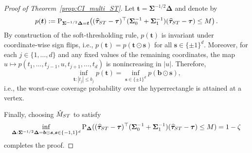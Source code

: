 \documentclass[10pt,a4paper]{amsart}
\def\P{{\mathrm P}}
\newcommand{\htau}{\widehat\tau}
\begin{document}
\begin{proof}[Proof of Theorem~\ref{prop:CI_multi_ST}]
Let $\bm{t}=\bm{\Sigma}^{-1/2}\bm{\Delta}$ and denote by
\[
p(\bm{t})
:=\P_{\bm{\Sigma}^{-1/2}\bm{\Delta}=\bm{t}}\!\left(
(\bm{\htau}_{\rm ST}-\bm{\tau})^\top(\bm{\Sigma}_0^{-1}+\bm{\Sigma}_1^{-1})
(\bm{\htau}_{\rm ST}-\bm{\tau})\le M
\right).
\]
By construction of the soft-thresholding rule,
$p(\bm{t})$ is invariant under coordinate-wise sign flips, i.e.,
$p(\bm{t})=p(\bm{t}\odot\bm{s})$ for all $\bm{s}\in\{\pm1\}^d$.
Moreover, for each $j\in\{1,\ldots,d\}$ and any fixed values of the remaining coordinates,
the map $u\mapsto p(t_1,\ldots,t_{j-1},u,t_{j+1},\ldots,t_d)$ is nonincreasing in $\lvert u \rvert$.
Therefore,
\[
\inf_{\bm{t}:|t_j|\le b_j} p(\bm{t})
=\inf_{\bm{s}\in\{\pm1\}^d} p(\bm{b}\odot\bm{s}),
\]
i.e., the worst-case coverage probability over the hyperrectangle is attained at a vertex.

Finally, choosing $\hat M_{\rm ST}$ to satisfy
\[
  \inf_{\bm{\Delta}: \bm{\Sigma}^{-1/2} \bm{\Delta} = \bm{b} \odot \bm{s}, \bm{s} \in \{-1,1\}^d} \P_{\bm{\Delta}}((\bm{\htau}_{\rm ST} - \bm{\tau})^\top (\bm{\Sigma}_0^{-1} + \bm{\Sigma}_1^{-1}) (\bm{\htau}_{\rm ST} - \bm{\tau}) \le M) = 1-\zeta
\]
completes the proof.

\end{proof}
\end{document}
